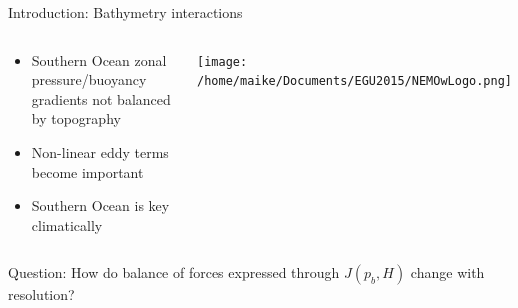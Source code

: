 \documentclass{beamer}
\begin{document}
\begin{frame}{Introduction: Bathymetry interactions}
\begin{columns}[c]
\column{3in}
\centering
\begin{alertblock}{}
\begin{center}
\begin{itemize}%
  \item \small \alert{Southern Ocean} zonal pressure/buoyancy gradients \alert{not} balanced by topography
  \vspace{15}
  \item \small Non-linear eddy terms become important 
  \vspace{15}
  \item \small Southern Ocean is key climatically 
\end{itemize}
\end{center}
\end{alertblock}
\column{2in}

\begin{flushright}
\texttt{[image: /home/maike/Documents/EGU2015/NEMOwLogo.png]}\end{flushright}
\end{columns}
\pause
\begin{alertblock}{Question:}
\centering
 \alert{How do balance of forces expressed through $J(p_{b}, H)$ change with \alert{resolution}?}
\end{alertblock}
\end{frame}
\end{document}
